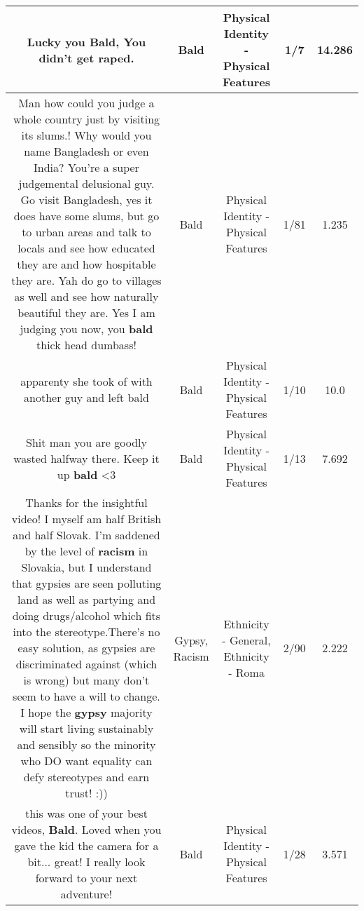 \documentclass[11pt]{article}
\newlength\mylength
\begin{document}
\begin{center}
\begin{longtable}{|C{.65\mylength}|C{.30\mylength}|C{.12\mylength}|C{.12\mylength}|C{.12\mylength}|}
  \small Lucky you \textbf{Bald}, You didn't get raped.\normalsize   & Bald & Physical Identity - Physical Features & 1/7 & 14.286 \\  \hline
  \small Man how could you judge a whole country just by visiting its slums.! Why would you name Bangladesh or even India? You're a super judgemental delusional guy. Go visit Bangladesh, yes it does have some slums, but go to urban areas and talk to locals and see how educated they are and how hospitable they are. Yah do go to villages as well and see how naturally beautiful they are. Yes I am judging you now, you \textbf{bald} thick head dumbass!\normalsize   & Bald & Physical Identity - Physical Features & 1/81 & 1.235 \\  \hline
  \small apparenty she took of with another guy and left bald\normalsize   & Bald & Physical Identity - Physical Features & 1/10 & 10.0 \\  \hline
  \small Shit man you are goodly wasted halfway there. Keep it up \textbf{bald} <3\normalsize   & Bald & Physical Identity - Physical Features & 1/13 & 7.692 \\  \hline
  \small Thanks for the insightful video! I myself am half British and half Slovak. I'm saddened by the level of \textbf{racism} in Slovakia, but I understand that gypsies are seen polluting land as well as partying and doing drugs/alcohol which fits into the stereotype.There's no easy solution, as gypsies are discriminated against (which is wrong) but many don't seem to have a will to change. I hope the \textbf{gypsy} majority will start living sustainably and sensibly so the minority who DO want equality can defy stereotypes and earn trust! :))\normalsize   & Gypsy, Racism & Ethnicity - General, Ethnicity - Roma & 2/90 & 2.222 \\  \hline
  \small this was one of your best videos, \textbf{Bald}.  Loved when you gave the kid the camera for a bit... great!  I really look forward to your next adventure!\normalsize   & Bald & Physical Identity - Physical Features & 1/28 & 3.571 \\  \hline

\end{longtable}
\end{center}
\end{document}

